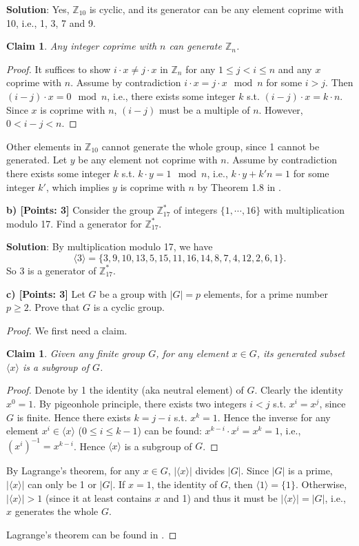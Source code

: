 \documentclass[12pt]{article}
\newcommand{\Z}{\mathbb{Z}}
\newcommand{\angles}[1]{\langle #1 \rangle}
\newtheorem{claim}[theorem]{Claim}
\theoremstyle{definition}
\begin{document}
{\bf Solution}: Yes, $\Z_{10}$ is cyclic, and its generator can be any element coprime with 10, i.e., 1, 3, 7 and 9. 
\begin{claim}
Any integer coprime with $n$ can generate $\Z_n$.
\end{claim}
\begin{proof}
It suffices to show $i\cdot x \not= j \cdot x$ in $\Z_n$ for any $1\leq j < i \leq n$ and any $x$ coprime with $n$. Assume by contradiction $i\cdot x = j \cdot x \mod n$ for some $i > j$. Then $(i-j)\cdot x =0 \mod n$, i.e., there exists some integer $k$ s.t. $(i-j)\cdot x = k\cdot n$. Since $x$ is coprime with $n$, $(i-j)$ must be a multiple of $n$. However, $0 < i-j < n$.
\end{proof}
Other elements in $\Z_{10}$ cannot generate the whole group, since 1 cannot be generated. Let $y$ be any element not coprime with $n$. Assume by contradiction there exists some integer $k$ s.t. $k\cdot y = 1 \mod n$, i.e., $k\cdot y + k' n = 1$ for some integer $k'$, which implies $y$ is coprime with $n$ by Theorem 1.8 in \cite{Shoup09}.

{\bf b) [Points: 3]} Consider the group $\Z_{17}^*$ of integers $\{1, \cdots, 16\}$ with multiplication modulo 17. Find a generator for $\Z_{17}^*$.

{\bf Solution}: By multiplication modulo 17, we have 
$$\angles{3} = \{3, 9, 10, 13, 5, 15, 11, 16, 14, 8, 7, 4, 12, 2, 6, 1\}.$$
So 3 is a generator of $\Z_{17}^*$.

{\bf c) [Points: 3]} Let $G$ be a group with $|G| = p$ elements, for a prime number $p\geq 2$. Prove that $G$ is a cyclic group.
\begin{proof}
We first need a claim.
\begin{claim}
Given any finite group $G$, for any element $x\in G$, its generated subset $\angles{x}$ is a subgroup of $G$.
\end{claim}
\begin{proof}
Denote by 1 the identity (aka neutral element) of $G$. Clearly the identity $x^0 = 1$. By pigeonhole principle, there exists two integers $i < j$ s.t. $x^i = x^j$, since $G$ is finite. Hence there exists $k = j-i$ s.t. $x^k = 1$. Hence the inverse for any element $x^i \in \angles{x}$ ($0\leq i \leq k-1$) can be found: $x^{k-i} \cdot x^i = x^{k} = 1$, i.e., $(x^i)^{-1} = x^{k-i}$. Hence $\angles{x}$ is a subgroup of $G$.
\end{proof}
By Lagrange's theorem, for any $x\in G$, $|\angles{x}|$ divides $|G|$. Since $|G|$ is a prime, $|\angles{x}|$ can only be 1 or $|G|$. If $x=1$, the identity of $G$, then $\angles{1} = \{1\}$. Otherwise, $|\angles{x}|>1$ (since it at least contains $x$ and 1) and thus it must be $|\angles{x}| = |G|$, i.e., $x$ generates the whole $G$.

Lagrange's theorem can be found in \cite{Shoup09}.
\end{proof}
\end{document}
